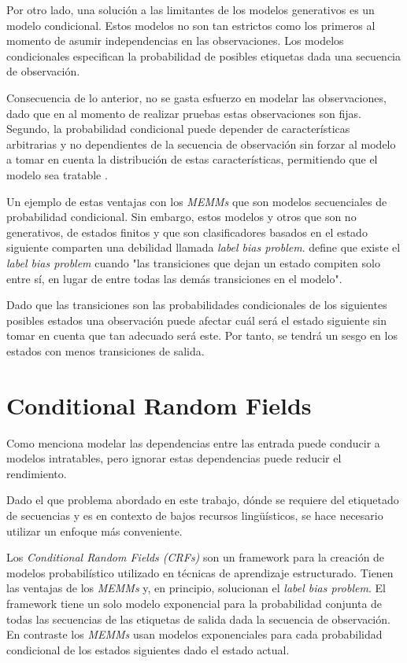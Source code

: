 \documentclass[letterpaper,12pt,oneside]{book}
\begin{document}
Por otro lado, una solución a las limitantes de los modelos generativos es un modelo condicional. Estos modelos no son tan estrictos como los primeros al momento de asumir independencias en las observaciones. Los modelos condicionales especifican la probabilidad de posibles etiquetas dada una secuencia de observación.

Consecuencia de lo anterior, no se gasta esfuerzo en modelar las observaciones, dado que en al momento de realizar pruebas estas observaciones son fijas. Segundo, la probabilidad condicional puede depender de características arbitrarias y no dependientes de la secuencia de observación sin forzar al modelo a tomar en cuenta la distribución de estas características, permitiendo que el modelo sea tratable \citep{lafferty2001conditional}.

Un ejemplo de estas ventajas con los \textit{MEMMs} que son modelos secuenciales de probabilidad condicional. Sin embargo, estos modelos y otros que son no generativos, de estados finitos y que son clasificadores basados en el estado siguiente comparten una debilidad llamada \emph{label bias problem}. \citet{lafferty2001conditional} define que existe el \emph{label bias problem} cuando "las transiciones que dejan un estado compiten solo entre sí, en lugar de entre todas las demás transiciones en el modelo".

Dado que las transiciones son las probabilidades condicionales de los siguientes posibles estados una observación puede afectar cuál será el estado siguiente sin tomar en cuenta que tan adecuado será este. Por tanto, se tendrá un sesgo en los estados con menos transiciones de salida.


\section{Conditional Random Fields}

Como menciona \citet{sutton2012introduction} modelar las dependencias entre las entrada puede conducir a modelos intratables, pero ignorar estas dependencias puede reducir el rendimiento.

Dado el que problema abordado en este trabajo, dónde se requiere del etiquetado de secuencias y es en contexto de bajos recursos lingüísticos, se hace necesario utilizar un enfoque más conveniente.

Los \textit{Conditional Random Fields (CRFs)} son un framework para la creación de modelos probabilístico utilizado en técnicas de aprendizaje estructurado. Tienen las ventajas de los \textit{MEMMs} y, en principio, solucionan el \emph{label bias problem}. El framework tiene un solo modelo exponencial para la probabilidad conjunta de todas las secuencias de las etiquetas de salida dada la secuencia de observación. En contraste los \emph{MEMMs} usan modelos exponenciales para cada probabilidad condicional de los estados siguientes dado el estado actual.
\end{document}

